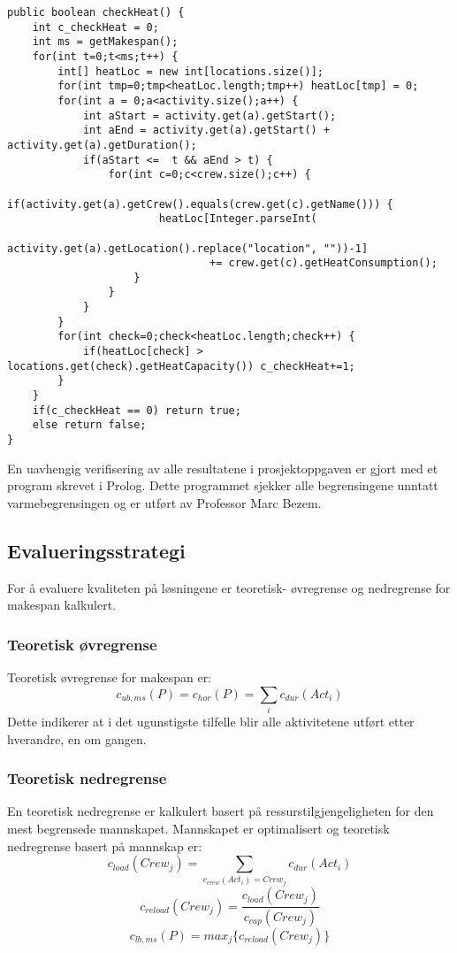 {\tiny %
\begin{lstlisting}[label=heatChecker,caption=Validering av varmebegrensing]
public boolean checkHeat() {
	int c_checkHeat = 0;
	int ms = getMakespan();
	for(int t=0;t<ms;t++) {
		int[] heatLoc = new int[locations.size()];
		for(int tmp=0;tmp<heatLoc.length;tmp++) heatLoc[tmp] = 0;
		for(int a = 0;a<activity.size();a++) {
			int aStart = activity.get(a).getStart();
			int aEnd = activity.get(a).getStart() + activity.get(a).getDuration();
			if(aStart <=  t && aEnd > t) {
				for(int c=0;c<crew.size();c++) {
					if(activity.get(a).getCrew().equals(crew.get(c).getName())) {
						heatLoc[Integer.parseInt(
							activity.get(a).getLocation().replace("location", ""))-1] 
								+= crew.get(c).getHeatConsumption();
					}
				}
			}
		}
		for(int check=0;check<heatLoc.length;check++) {
			if(heatLoc[check] > locations.get(check).getHeatCapacity()) c_checkHeat+=1;
		}
	}
	if(c_checkHeat == 0) return true;
	else return false;
}
\end{lstlisting}
} %

En uavhengig verifisering av alle resultatene i prosjektoppgaven er gjort med et program skrevet i Prolog. Dette programmet sjekker alle begrensingene unntatt varmebegrensingen og er utført av Professor Marc Bezem.

\subsection{Evalueringsstrategi}
\label{sec:strategy}
For å evaluere kvaliteten på løsningene er teoretisk- øvregrense og nedregrense for makespan kalkulert.

\subsubsection{Teoretisk øvregrense}
\label{sec:teoretiskovre}
Teoretisk øvregrense for makespan er:
\begin{equation}
c_{ub,ms}(P) = c_{hor}(P) = \sum_{i} c_{dur}(Act_{i})
\end{equation}
Dette indikerer at i det ugunstigste tilfelle blir alle aktivitetene utført etter hverandre, en om gangen.

\subsubsection{Teoretisk nedregrense}
\label{sec:teoretisknedre}
En teoretisk nedregrense er kalkulert basert på ressurstilgjengeligheten for den mest begrensede mannskapet. Mannskapet er optimalisert og teoretisk nedregrense basert på mannskap er:
\begin{equation}
c_{load}(Crew_{j}) = \sum_{c_{crew}(Act_{i}) = Crew_{j}} c_{dur}(Act_{i})
\end{equation}
\begin{equation}
c_{reload}(Crew_{j}) = \frac{c_{load}(Crew_{j})}{c_{cap}(Crew_{j})}
\label{eq:mannskapsstyrke}
\end{equation}
\begin{equation}
c_{lb,ms}(P) = max_{j}\{ c_{reload}(Crew_{j}) \}
\end{equation}